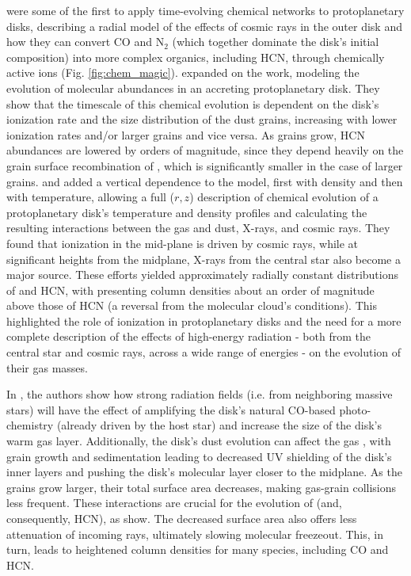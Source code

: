 \citet{Aikawa1997} were some of the first to apply time-evolving chemical networks to protoplanetary disks, describing a radial model of the effects of cosmic rays in the outer disk and how they can convert CO and N$_2$ (which together dominate the disk's initial composition) into more complex organics, including HCN, through chemically active ions (Fig. \ref{fig:chem_magic}). \citet{Aikawa1999} expanded on the work, modeling the evolution of molecular abundances in an accreting protoplanetary disk. They show that the timescale of this chemical evolution is dependent on the disk's ionization rate and the size distribution of the dust grains, increasing with lower ionization rates and/or larger grains and vice versa. As grains grow, HCN abundances are lowered by orders of magnitude, since they depend heavily on the grain surface recombination of \hco, which is significantly smaller in the case of larger grains. \citet{AikawaHerbst1999} and \citet{Aikawa2002} added a vertical dependence to the model, first with density and then with temperature, allowing a full ($r, z$) description of chemical evolution of a protoplanetary disk's temperature and density profiles and calculating the resulting interactions between the gas and dust, X-rays, and cosmic rays. They found that ionization in the mid-plane is driven by cosmic rays, while at significant heights from the midplane, X-rays from the central star also become a major source. These efforts yielded approximately radially constant distributions of \hco and HCN, with \hco presenting column densities about an order of magnitude above those of HCN (a reversal from the molecular cloud's conditions). This highlighted the role of ionization in protoplanetary disks and the need for a more complete description of the effects of high-energy radiation - both from the central star and cosmic rays, across a wide range of energies - on the evolution of their gas masses.



In \citet{Fogel2011}, the authors show how strong radiation fields (i.e. from neighboring massive stars) will have the effect of amplifying the disk's natural CO-based photo-chemistry (already driven by the host star) and increase the size of the disk's warm gas layer. Additionally, the disk's dust evolution can affect the gas \citep{Fogel2011,Akimkin2013}, with grain growth and sedimentation leading to decreased UV shielding of the disk's inner layers and pushing the disk's molecular layer closer to the midplane. As the grains grow larger, their total surface area decreases, making gas-grain collisions less frequent. These interactions are crucial for the evolution of \hco (and, consequently, HCN), as \citet{Aikawa1999b} show. The decreased surface area also offers less attenuation of incoming rays, ultimately slowing molecular freezeout. This, in turn, leads to heightened column densities for many species, including CO and HCN.


